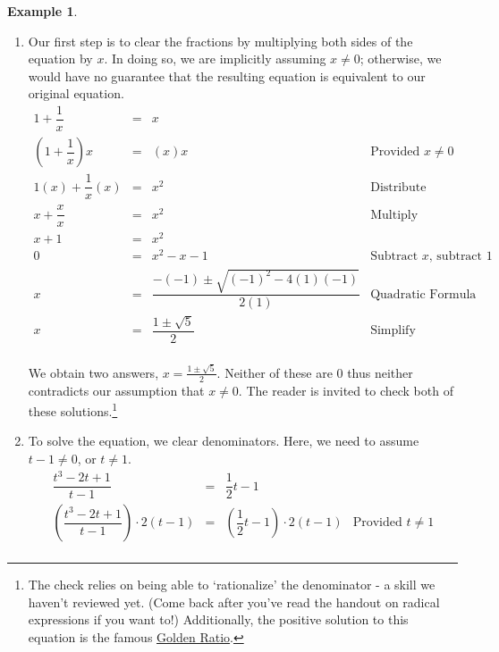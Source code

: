 \documentclass[11pt]{article}
\theoremstyle{definition}  %
\newtheorem{ex}{\bf Example}
\begin{document}
\begin{ex}
\begin{enumerate}
\item   Our first step is to clear the fractions by multiplying both sides of the equation by $x$. In doing so, we are implicitly assuming $x \neq 0$; otherwise, we would have no guarantee that the resulting equation is equivalent to our original equation.\[ \begin{array}{rclr}

1 + \dfrac{1}{x} & = & x & \\ [8pt]

\left(1 + \dfrac{1}{x}\right) x & = & (x)x & \text{Provided $x \neq 0$} \\ [10pt]


1(x) + \dfrac{1}{x} (x) & = & x^2 & \text{Distribute} \\ [8pt]

x + \dfrac{x}{x} & = & x^2 & \text{Multiply} \\ [8pt]

x + 1 & = & x^2 &  \\

0 & = & x^2 - x - 1 & \text{Subtract $x$, subtract $1$} \\ [5pt]

x & = & \dfrac{-(-1) \pm \sqrt{(-1)^2 - 4(1)(-1)}}{2(1)} & \text{Quadratic Formula} \\

x & = & \dfrac{1 \pm \sqrt{5}}{2} & \text{Simplify} \\

\end{array}\]

We obtain two answers, $x = \frac{1 \pm \sqrt{5}}{2}$.  Neither of these are $0$ thus neither contradicts our assumption that $x \neq 0$.  The reader is invited to check both of these solutions.\footnote{The check relies on being able to `rationalize' the denominator  - a skill we haven't reviewed yet. (Come back after you've read the handout on radical expressions if you want to!)  Additionally, the positive solution to this equation is the famous \href{http://en.wikipedia.org/wiki/Golden_ratio}{\underline{Golden Ratio}}.}

\item  To solve the equation, we clear denominators.  Here, we need to assume $t-1 \neq 0$, or $t \neq 1$.\[ \begin{array}{rclr}

\dfrac{t^3-2t+1}{t-1} & = & \dfrac{1}{2}t-1 & \\ [8pt]

\left(\dfrac{t^3-2t+1}{t-1}\right) \cdot 2(t-1) & = & \left( \dfrac{1}{2}t-1 \right) \cdot 2(t-1) & \text{Provided $t \neq 1$} \\ [12pt]


\end{array}\]
\end{enumerate}
\end{ex}
\end{document}
